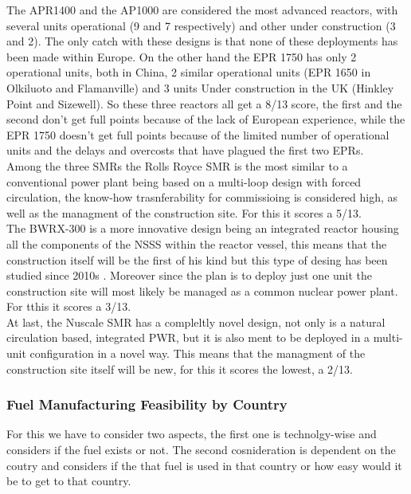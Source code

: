 The APR1400 and the AP1000 are considered the most advanced reactors, with several units operational (9 and 7 respectively) and other under construction (3 and 2). The only catch with these designs is that none of these deployments has been made within Europe. On the other hand the EPR 1750 has only 2 operational units, both in China, 2 similar operational units (EPR 1650 in Olkiluoto and Flamanville) and 3 units Under construction in the UK (Hinkley Point and Sizewell). So these three reactors all get a 8/13 score, the first and the second don't get full points because of the lack of European experience, while the EPR 1750 doesn't get full points because of the limited number of operational units and the delays and overcosts that have plagued the first two EPRs. \\

Among the three SMRs the Rolls Royce SMR is the most similar to a conventional power plant being based on a multi-loop design with forced circulation, the know-how trasnferability for commissioing is considered high, as well as the managment of the construction site. For this it scores a 5/13. \\

The BWRX-300 is a more innovative design being an integrated reactor housing all the components of the NSSS within the reactor vessel, this means that the construction itself will be the first of his kind but this type of desing has been studied since 2010s \cite{PLACEHOLDER}. Moreover since the plan is to deploy just one unit the construction site will most likely be managed as a common nuclear power plant. For tthis it scores a 3/13. \\

At last, the Nuscale SMR has a compleltly novel design, not only is a natural circulation based, integrated PWR, but it is also ment to be deployed in a multi-unit configuration in a novel way. This means that the managment of the construction site itself will be new, for this it scores the lowest, a 2/13. \\

\subsubsection{Fuel Manufacturing Feasibility by Country}
For this we have to consider two aspects, the first one is technolgy-wise and considers if the fuel exists or not. The second cosnideration is dependent on the coutry and considers if the that fuel is used in that country or how easy would it be to get to that country.

